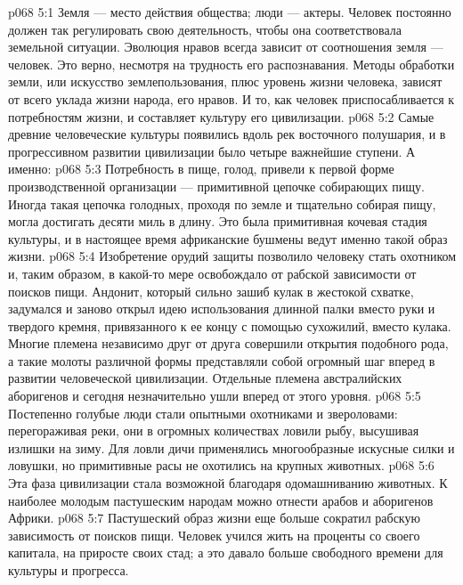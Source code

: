 \vs p068 5:1 Земля --- место действия общества; люди --- актеры. Человек постоянно должен так регулировать свою деятельность, чтобы она соответствовала земельной ситуации. Эволюция нравов всегда зависит от соотношения земля --- человек. Это верно, несмотря на трудность его распознавания. Методы обработки земли, или искусство землепользования, плюс уровень жизни человека, зависят от всего уклада жизни народа, его нравов. И то, как человек приспосабливается к потребностям жизни, и составляет культуру его цивилизации.
\vs p068 5:2 Самые древние человеческие культуры появились вдоль рек восточного полушария, и в прогрессивном развитии цивилизации было четыре важнейшие ступени. А именно:
\vs p068 5:3 \bibnobreakspace {} Потребность в пище, голод, привели к первой форме производственной организации --- примитивной цепочке собирающих пищу. Иногда такая цепочка голодных, проходя по земле и тщательно собирая пищу, могла достигать десяти миль в длину. Это была примитивная кочевая стадия культуры, и в настоящее время африканские бушмены ведут именно такой образ жизни.
\vs p068 5:4 \bibnobreakspace {} Изобретение орудий защиты позволило человеку стать охотником и, таким образом, в какой\hyp{}то мере освобождало от рабской зависимости от поисков пищи. Андонит, который сильно зашиб кулак в жестокой схватке, задумался и заново открыл идею использования длинной палки вместо руки и твердого кремня, привязанного к ее концу с помощью сухожилий, вместо кулака. Многие племена независимо друг от друга совершили открытия подобного рода, а такие молоты различной формы представляли собой огромный шаг вперед в развитии человеческой цивилизации. Отдельные племена австралийских аборигенов и сегодня незначительно ушли вперед от этого уровня.
\vs p068 5:5 Постепенно голубые люди стали опытными охотниками и звероловами: перегораживая реки, они в огромных количествах ловили рыбу, высушивая излишки на зиму. Для ловли дичи применялись многообразные искусные силки и ловушки, но примитивные расы не охотились на крупных животных.
\vs p068 5:6 \bibnobreakspace {} Эта фаза цивилизации стала возможной благодаря одомашниванию животных. К наиболее молодым пастушеским народам можно отнести арабов и аборигенов Африки.
\vs p068 5:7 Пастушеский образ жизни еще больше сократил рабскую зависимость от поисков пищи. Человек учился жить на проценты со своего капитала, на приросте своих стад; а это давало больше свободного времени для культуры и прогресса.
